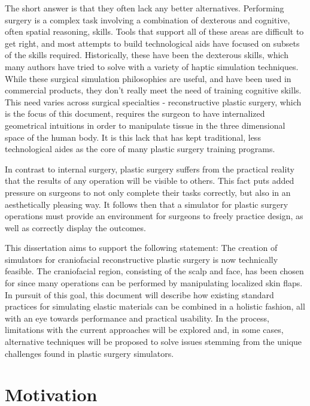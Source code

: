 \documentclass[12pt,oneside,letterpaper]{memoir}
\begin{document}
The short answer is that they often lack any better
alternatives. Performing surgery is a complex task involving a
combination of dexterous and cognitive, often spatial reasoning,
skills\cite{GallaRCHFMSS:2005}. Tools that support all of these areas
are difficult to get right, and most attempts to build technological
aids have focused on subsets of the skills required. Historically,
these have been the dexterous skills, which many authors have tried to
solve with a variety of haptic simulation
techniques\cite{MendoL:2003,LindbT:2007}. While these surgical
simulation philosophies are useful, and have been used in commercial
products\cite{SUSAC:2002--2014}, they don't really meet the need of
training cognitive skills. This need varies across surgical
specialties - reconstructive plastic surgery, which is the focus of this document,
requires the surgeon to have internalized geometrical intuitions in
order to manipulate tissue in the three dimensional space of the human
body. It is this lack that has kept traditional, less technological
aides as the core of many plastic surgery training programs.

In contrast to internal surgery, plastic surgery suffers from the
practical reality that the results of any operation will be visible to
others. This fact puts added pressure on surgeons to not only complete
their tasks correctly, but also in an aesthetically pleasing way. It
follows then that a simulator for plastic surgery operations must
provide an environment for surgeons to freely practice design, as well
as correctly display the outcomes.

This dissertation aims to support the following statement: The creation
of simulators for craniofacial reconstructive plastic surgery is now
technically feasible. The craniofacial region, consisting of the scalp
and face, has been chosen for since many operations can be performed
by manipulating localized skin flaps. In pursuit of this goal, this document will
describe how existing standard practices for simulating elastic
materials can be combined in a holistic fashion, all with an eye
towards performance and practical usability. In the process,
limitations with the current approaches will be explored and, in some
cases, alternative techniques will be proposed to solve issues
stemming from the unique challenges found in plastic surgery simulators.


\chapter{Motivation}
\end{document}
